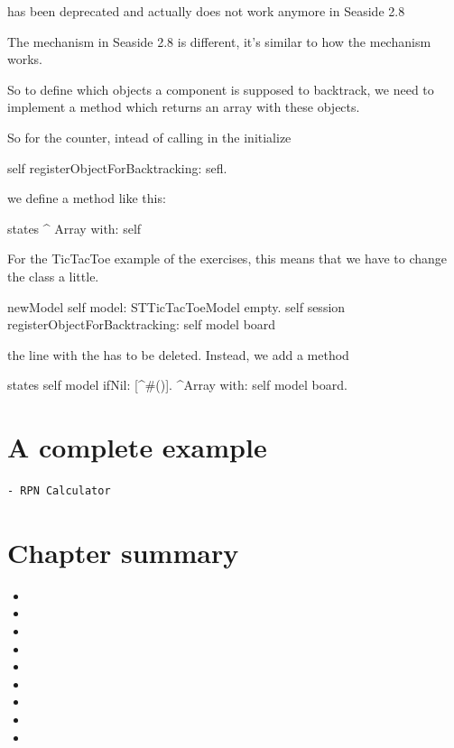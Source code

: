 \documentclass[a4paper,10pt,twoside]{book}
\begin{document}
 has been deprecated and actually does not work
anymore in Seaside 2.8


The mechanism in Seaside 2.8 is different, it's similar to how the  mechanism works.

So to define which objects a component is supposed to backtrack, we need to implement a method  which returns an array with these objects.

So for the counter, intead of calling in the initialize

\begin{code}
	self registerObjectForBacktracking: sefl.
\end{code}

we define a method  like this:

\begin{code}
states
	^ Array with: self
\end{code}


For the TicTacToe example of the exercises, this means that we have to change
the class  a little.

\begin{code}
newModel
	self model: STTicTacToeModel empty.
	self session registerObjectForBacktracking: self model board
\end{code}

the line with the  has to be deleted. Instead, we add a method 

\begin{code}
states
	self model ifNil: [^#()].
	^Array with: self model board.
\end{code}



\section{A complete example}
\begin{verbatim}
- RPN Calculator
\end{verbatim}

\section{Chapter summary}

\begin{itemize}
  \item 
  \item 
  \item 
  \item 
  \item 
  \item 
  \item 
  \item 
  \item 
\end{itemize}


\ifx\wholebook\relax\else 
   
   
\end{document}
